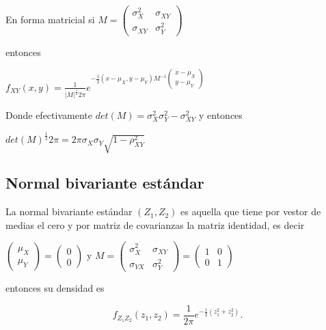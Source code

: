 \documentclass[12pt]{report}
\begin{document}
En forma matricial si $M=\left(\begin{array}{cc}\sigma_{X}^{2} & \sigma_{XY}\\
\sigma_{XY}&\sigma_{Y}^{2}\end{array} \right)$

entonces

$f_{XY}(x,y)=
\frac{1}{|M|^{\frac{1}{2}} 2\pi} e^{-\frac{1}{2} (x-\mu_{X},y-\mu_{Y}) M^{-1}
\left(\begin{array}{c} x-\mu_{X}\\ y-\mu_{Y}
\end{array}\right)}$

Donde efectivamente $det(M)=\sigma_{X}^2\sigma_{Y}^2-\sigma_{XY}^2$ y entonces

$det(M)^{\frac{1}{2}} 2\pi= 2\pi\sigma_{X}\sigma_{Y}\sqrt{1-\rho_{XY}^{2}}$

\subsection{Normal bivariante estándar}

La normal bivariante estándar $(Z_{1},Z_{2})$ es aquella que tiene por vestor de medias el cero y por matriz de covarianzas la matriz identidad, es decir 

$\left(
\begin{array}{c}
    \mu_{X} \\
    \mu_{Y}
\end{array}
\right)=\left(
\begin{array}{c}
    0 \\
   0
\end{array}
\right)
$
y $M=\left(\begin{array}{cc}\sigma_{X}^{2} & \sigma_{XY}\\ \sigma_{YX}&\sigma_{Y}^{2}
\end{array}\right)= \left(\begin{array}{cc}1 & 0\\
0&1\end{array}\right)$

entonces su densidad es 

$$f_{Z_{1}Z_{2}}(z_{1},z_{2})=\frac{1}{2\pi} e^{-\frac{1}{2} (z_{1}^2+z_{2}^2)}.$$
\end{document}
